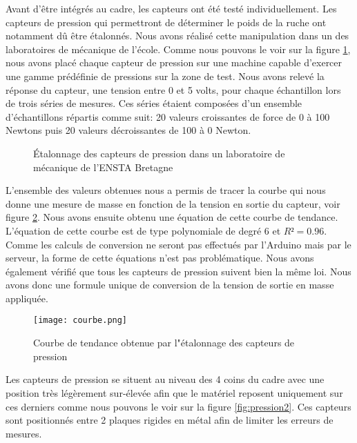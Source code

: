Avant d'être intégrés au cadre, les capteurs ont été testé individuellement. Les capteurs de pression qui permettront de déterminer le poids de la ruche ont notamment dû être étalonnés. Nous avons réalisé cette manipulation dans un des laboratoires de mécanique de l'école. Comme nous pouvons le voir sur la figure \ref{fig:pression}, nous avons placé chaque capteur de pression sur une machine capable d'exercer une gamme prédéfinie de pressions sur la zone de test. Nous avons relevé la réponse du capteur, une tension entre 0 et 5 volts, pour chaque échantillon lors de trois séries de mesures. Ces séries étaient composées d'un ensemble d'échantillons répartis comme suit: 20 valeurs croissantes de force de 0 à 100 Newtons puis 20 valeurs décroissantes de 100 à 0 Newton.

\begin{figure}[h]
\centering
	\quad
	\caption{\label{fig:pression} \'Etalonnage des capteurs de pression dans un laboratoire de mécanique de l'ENSTA Bretagne }
\end{figure}


L'ensemble des valeurs obtenues nous a permis de tracer la courbe qui nous donne une mesure de masse en fonction de la tension en sortie du capteur, voir figure \ref{fig:courbe}. Nous avons ensuite obtenu une équation de cette courbe de tendance. L'équation de cette courbe est de type polynomiale de degré 6 et $R²=0.96$. Comme les calculs de conversion ne seront pas effectués par l'Arduino mais par le serveur, la forme de cette équations n'est pas problématique. Nous avons également vérifié que tous les capteurs de pression suivent bien la même loi. Nous avons donc une formule unique de conversion de la tension de sortie en masse appliquée.

\begin{figure}[!h]
\centering\texttt{[image: courbe.png]}
\caption{\label{fig:courbe} Courbe de tendance obtenue par l"étalonnage des capteurs de pression}
\end{figure} 

Les capteurs de pression se situent au niveau des 4 coins du cadre avec une position très légèrement sur-élevée afin que le matériel reposent uniquement sur ces derniers comme nous pouvons le voir sur la figure \ref{fig:pression2}. Ces capteurs sont positionnés entre 2 plaques rigides en métal afin de limiter les erreurs de mesures. 

